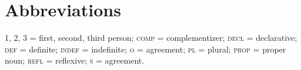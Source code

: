 \documentclass[output=paper]{LSP/langsci}
\begin{document}
\section*{Abbreviations}
1, 2, 3 = first, second, third person; \textsc{comp} = complementizer; \textsc{decl} = declarative; \textsc{def} = definite; \textsc{indef} = indefinite; \textsc{o} =  agreement; \textsc{pl} = plural; \textsc{prop} = proper noun; \textsc{refl} = reflexive; \textsc{s} =  agreement. 
 


\printbibliography[heading=subbibliography,notkeyword=this]
\end{document}
